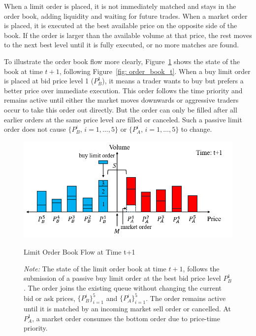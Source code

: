 When a limit order is placed, it is not immediately matched and stays in the order book, adding liquidity and waiting for future trades. When a market order is placed, it is executed at the best available price on the opposite side of the book. If the order is larger than the available volume at that price, the rest moves to the next best level until it is fully executed, or no more matches are found. 

To illustrate the order book flow more clearly, Figure~\ref{fig: order_book_t_1} shows the state of the book at time $t+1$, following Figure~\ref{fig: order_book_t}. When a buy limit order is placed at bid price level 1 ($P_B^1$), it means a trader wants to buy but prefers a better price over immediate execution. This order follows the time priority and remains active until either the market moves downwards or aggressive traders occur to take this order out directly. But the order can only be filled after all earlier orders at the same price level are filled or canceled. Such a passive limit order does not cause $\{P_B ^ {i}$, $i = 1, \dots, 5\}$ or $\{P_A ^ {i}$, $i = 1, \dots, 5\}$ to change. 

\begin{figure}[h]
    \centering
    \includegraphics[width=0.8\linewidth]{figures/order_book_t_1.png}
    \caption{Limit Order Book Flow at Time t+1}
    \caption*{\textit{Note:} The state of the limit order book at time $t+1$, follows the submission of a passive buy limit order at the best bid price level $P_B^1$. The order joins the existing queue without changing the current bid or ask prices, $\{P_B^i\}_{i=1}^5$ and $\{P_A^i\}_{i=1}^5$. The order remains active until it is matched by an incoming market sell order or cancelled. At $P_A^1$, a market order consumes the bottom order due to price-time priority.}
    \label{fig: order_book_t_1}
\end{figure}


